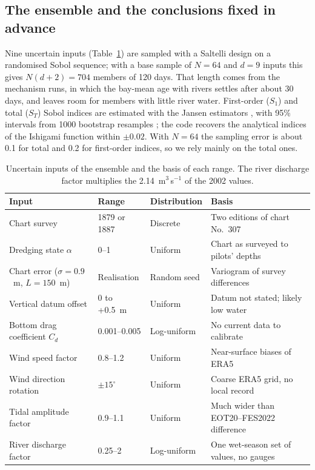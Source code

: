 \documentclass[a4paper,fleqn]{ems-dc}
\begin{document}
\subsection{The ensemble and the conclusions fixed in advance}\label{sec:ensemble}
Nine uncertain inputs (Table~\ref{tab:params}) are sampled with a Saltelli design
\citep{Saltelli2002} on a randomised Sobol sequence; with a base sample of $N = 64$ and
$d = 9$ inputs this gives $N(d+2) = 704$ members of 120 days. That length comes from the
mechanism runs, in which the bay-mean age with rivers settles after about 30 days, and
leaves room for members with little river water. First-order ($S_1$) and total ($S_T$) Sobol
indices are estimated with the Jansen estimators \citep{Jansen1999,Saltelli2010}, with 95\%
intervals from 1000 bootstrap resamples \citep{Archer1997}; the code recovers the analytical
indices of the Ishigami function \citep{Ishigami1990} within $\pm 0.02$. With $N = 64$ the
sampling error is about 0.1 for total and 0.2 for first-order indices, so we rely mainly on
the total ones.

\begin{table}[!t]
\centering
\caption{Uncertain inputs of the ensemble and the basis of each range. The river discharge
factor multiplies the 2.14~m$^3$\,s$^{-1}$ of the 2002 values.}\label{tab:params}
\begin{tabular}{llll}
\toprule
Input & Range & Distribution & Basis\\
\midrule
Chart survey & 1879 or 1887 & Discrete & Two editions of chart No.~307\\
Dredging state $\alpha$ & 0--1 & Uniform & Chart as surveyed to pilots' depths\\
Chart error ($\sigma = 0.9$~m, $L = 150$~m) & Realisation & Random seed & Variogram of
survey differences\\
Vertical datum offset & 0 to +0.5~m & Uniform & Datum not stated; likely low water\\
Bottom drag coefficient $C_d$ & 0.001--0.005 & Log-uniform & No current data to calibrate\\
Wind speed factor & 0.8--1.2 & Uniform & Near-surface biases of ERA5\\
Wind direction rotation & $\pm 15^\circ$ & Uniform & Coarse ERA5 grid, no local record\\
Tidal amplitude factor & 0.9--1.1 & Uniform & Much wider than EOT20--FES2022 difference\\
River discharge factor & 0.25--2 & Log-uniform & One wet-season set of values, no gauges\\
\bottomrule
\end{tabular}
\end{table}
\end{document}
